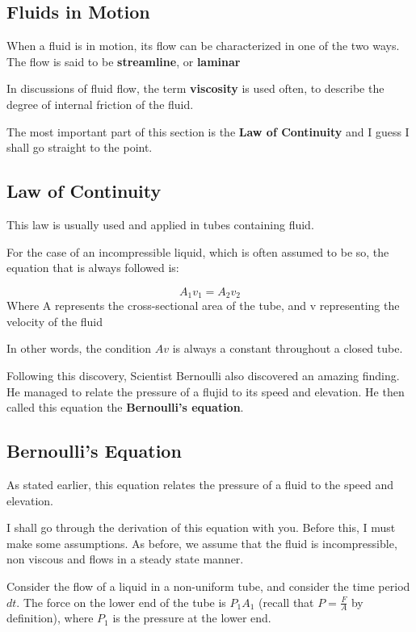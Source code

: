 \subsection{Fluids in Motion}
When a fluid is in motion, its flow can be characterized in one of the two ways. The flow is said to be \textbf{streamline}, or \textbf{laminar}

In discussions of fluid flow, the term \textbf{viscosity} is used often, to describe the degree of internal friction of the fluid.

The most important part of this section is the \textbf{Law of Continuity} and I guess I shall go straight to the point.

\subsection{Law of Continuity}\label{lawofc}
This law is usually used and applied in tubes containing fluid.

For the case of an incompressible liquid, which is often assumed to be so, the equation that is always followed is:
\begin{defi}
$$A_1v_1 = A_2v_2$$
Where A represents the cross-sectional area of the tube, and v representing the velocity of the fluid
\end{defi}
In other words, the condition $Av$ is always a constant throughout a closed tube.

Following this discovery, Scientist Bernoulli also discovered an amazing finding. He managed to relate the pressure of a flujid to its speed and elevation. He then called this equation the \textbf{Bernoulli's equation}.

\subsection{Bernoulli's Equation}
As stated earlier, this equation relates the pressure of a fluid to the speed and elevation.

I shall go through the derivation of this equation with you. Before this, I must make some assumptions. As before, we assume that the fluid is incompressible, non viscous and flows in a steady state manner.

Consider the flow of a liquid in a non-uniform tube, and consider the time period $d t$. The force on the lower end of the tube is $P_1A_1$ (recall that $P=\frac{F}{A}$ by definition), where $P_1$ is the pressure at the lower end.

